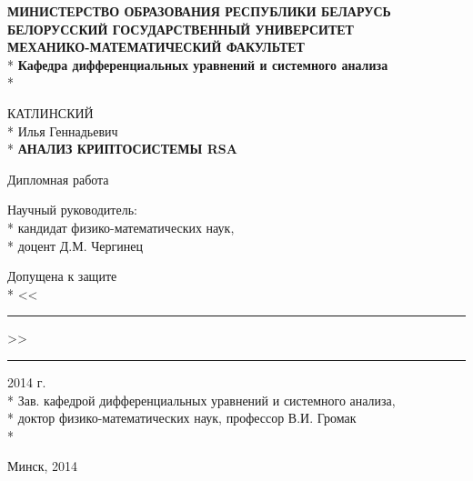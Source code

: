 
\begin{titlepage}
	\newpage

	\begin{center}
		\textbf{МИНИСТЕРСТВО ОБРАЗОВАНИЯ РЕСПУБЛИКИ БЕЛАРУСЬ} \\
		\vspace{0.5cm}
		\textbf{БЕЛОРУССКИЙ ГОСУДАРСТВЕННЫЙ УНИВЕРСИТЕТ} \\
		\vspace{0.5cm}		
		\textbf{МЕХАНИКО-МАТЕМАТИЧЕСКИЙ ФАКУЛЬТЕТ} \\*
		\vspace{0.5cm}
		\textbf{Кафедра дифференциальных уравнений и системного анализа} \\*
	\end{center}

	\vspace{5em}

	\begin{center}
		КАТЛИНСКИЙ \\*
		Илья Геннадьевич \\*
		\vspace{0.5cm}
		\textbf{АНАЛИЗ КРИПТОСИСТЕМЫ RSA}
	\end{center}

	\vspace{2.5em}
	 
	\begin{center}
		Дипломная работа
	\end{center}

	\vspace{6em}
	 
	\begin{flushright}
		Научный руководитель: \\*
		кандидат физико-математических наук, \\*
		доцент Д.М. Чергинец	
	\end{flushright}

	\begin{flushleft}
		Допущена к защите \\*
		\vspace{0.2cm}
		<<\rule{1cm}{0.1pt}>> \rule{4cm}{0.1pt} 2014 г.\\*
		\vspace{0.2cm}
		Зав. кафедрой дифференциальных уравнений и системного анализа, \\*
		доктор физико-математических наук, профессор В.И. Громак \\*		
	\end{flushleft}
	 
	\vspace{\fill}

	\begin{center}
		Минск, 2014
	\end{center}
\end{titlepage}